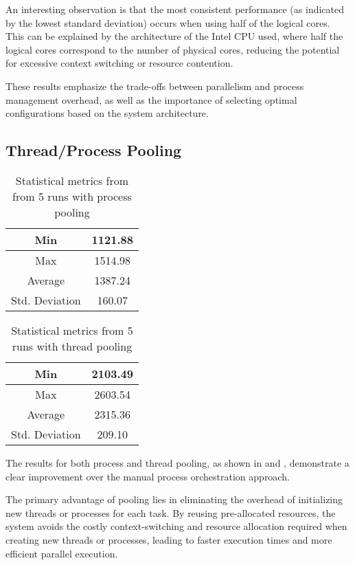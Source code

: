 \documentclass[a4paper, oneside]{article}
\begin{document}
An interesting observation is that the most consistent performance (as indicated by the lowest standard deviation) occurs when using half of the logical cores. This can be explained by the architecture of the Intel CPU used, where half the logical cores correspond to the number of physical cores, reducing the potential for excessive context switching or resource contention.

These results emphasize the trade-offs between parallelism and process management overhead, as well as the importance of selecting optimal configurations based on the system architecture.

\subsection{Thread/Process Pooling}
\begin{table}[h]
    \centering
    \begin{tabular}{c | c}
        \hline
        Min            & 1121.88 \\
        \hline
        Max            & 1514.98 \\
        \hline
        Average        & 1387.24 \\
        \hline
        Std. Deviation & 160.07  \\
        \hline
    \end{tabular}
    \caption{Statistical metrics from from 5 runs with process pooling}
    \label{table:process-pool}
\end{table}
\begin{table}[h]
    \centering
    \begin{tabular}{c | c}
        \hline
        Min            & 2103.49 \\
        \hline
        Max            & 2603.54 \\
        \hline
        Average        & 2315.36 \\
        \hline
        Std. Deviation & 209.10  \\
        \hline
    \end{tabular}
    \caption{Statistical metrics from 5 runs with thread pooling}
    \label{table:thread-pool}
\end{table}
The results for both process and thread pooling, as shown in  and , demonstrate a clear improvement over the manual process orchestration approach.

The primary advantage of pooling lies in eliminating the overhead of initializing new threads or processes for each task. By reusing pre-allocated resources, the system avoids the costly context-switching and resource allocation required when creating new threads or processes, leading to faster execution times and more efficient parallel execution.
\end{document}
